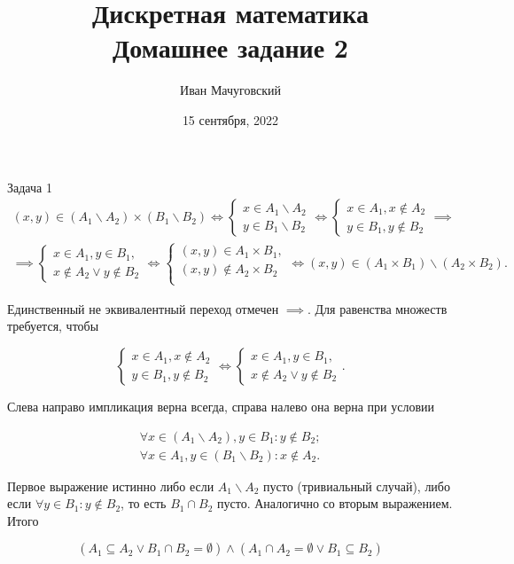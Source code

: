\documentclass{article}
\date{15 сентября, 2022}
\title{Дискретная математика \\ \Large Домашнее задание 2}
\author{Иван Мачуговский}
\renewcommand{\setminus}{\mathbin{\backslash}}
\begin{document}
	\maketitle

	\begin{section}{Задача 1}
		\begin{multline*}
			(x, y) \in (A_1 \setminus A_2) \times (B_1 \setminus B_2)
			\iff
			\begin{cases}
				x \in A_1 \setminus A_2 \\
				y \in B_1 \setminus B_2
			\end{cases}
			\iff
			\begin{cases}
				x \in A_1, x \not\in A_2 \\
				y \in B_1, y \not\in B_2
			\end{cases}
			\implies \\ \implies
			\begin{cases}
				x \in A_1, y \in B_1, \\
				x \not\in A_2 \lor y \not\in B_2
			\end{cases}
			\iff
			\begin{cases}
				(x, y) \in A_1 \times B_1, \\
				(x, y) \not\in A_2 \times B_2 \\
			\end{cases}
			\iff
			(x, y) \in (A_1 \times B_1) \setminus (A_2 \times B_2).
		\end{multline*}

		Единственный не эквивалентный переход отмечен $\implies$. Для равенства множеств требуется, чтобы

		\begin{equation*}
			\begin{cases}
				x \in A_1, x \not\in A_2 \\
				y \in B_1, y \not\in B_2
			\end{cases}
			\iff
			\begin{cases}
				x \in A_1, y \in B_1, \\
				x \not\in A_2 \lor y \not\in B_2
			\end{cases}.
		\end{equation*}

		Слева направо импликация верна всегда, справа налево она верна при условии

		\begin{gather*}
			\forall x \in (A_1 \setminus A_2), y \in B_1: y \not\in B_2; \\
			\forall x \in A_1, y \in (B_1 \setminus B_2): x \not\in A_2.
		\end{gather*}

		Первое выражение истинно либо если $A_1 \setminus A_2$ пусто (тривиальный случай), либо если $\forall y \in B_1: y \not\in B_2$, то есть $B_1 \cap B_2$ пусто. Аналогично со вторым выражением. Итого

		\begin{equation*}
			(A_1 \subseteq A_2 \lor B_1 \cap B_2 = \emptyset) \land (A_1 \cap A_2 = \emptyset \lor B_1 \subseteq B_2)
		\end{equation*}
	\end{section}
\end{document}
